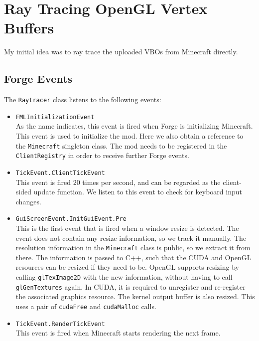 \documentclass[]{article}
\begin{document}
\section{Ray Tracing OpenGL Vertex Buffers}
My initial idea was to ray trace the uploaded VBOs from Minecraft directly.

\subsection{Forge Events}
The \texttt{Raytracer} class listens to the following events:
\begin{itemize}
  \item \texttt{FMLInitializationEvent} \\
    As the name indicates, this event is fired when Forge is initializing Minecraft.
    This event is used to initialize the mod.
    Here we also obtain a reference to the \texttt{Minecraft} singleton class.
    The mod needs to be registered in the \texttt{ClientRegistry} in order to receive further Forge events.
  \item \texttt{TickEvent.ClientTickEvent} \\
    This event is fired 20 times per second, and can be regarded as the client-sided update function.
    We listen to this event to check for keyboard input changes.
  \item \texttt{GuiScreenEvent.InitGuiEvent.Pre} \\
    This is the first event that is fired when a window resize is detected.
    The event does not contain any resize information, so we track it manually.
    The resolution information in the \texttt{Minecraft} class is public, so we extract it from there.
    The information is passed to C++, such that the CUDA and OpenGL resources can be resized if they need to be.
    OpenGL supports resizing by calling \texttt{glTexImage2D} with the new information, without having to call \texttt{glGenTextures} again.
    In CUDA, it is required to unregister and re-register the associated graphics resource.
    The kernel output buffer is also resized. This uses a pair of \texttt{cudaFree} and \texttt{cudaMalloc} calls.

  \item \texttt{TickEvent.RenderTickEvent} \\
    This event is fired when Minecraft starts rendering the next frame.
    

\end{itemize}
\end{document}
